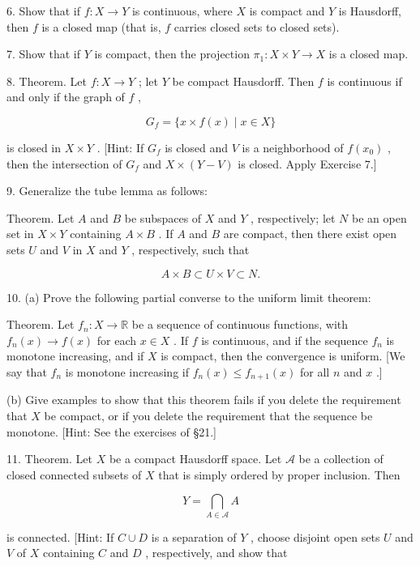 \documentclass[10pt]{article}
\begin{document}
6. Show that if \(f : X \rightarrow  Y\) is continuous, where \(X\) is compact and \(Y\) is Hausdorff, then \(f\) is a closed map (that is, \(f\) carries closed sets to closed sets).

7. Show that if \(Y\) is compact, then the projection \({\pi }_{1} : X \times  Y \rightarrow  X\) is a closed map.

8. Theorem. Let \(f : X \rightarrow  Y\) ; let \(Y\) be compact Hausdorff. Then \(f\) is continuous if and only if the graph of \(f\) ,

\[
{G}_{f} = \{ x \times  f\left( x\right)  \mid  x \in  X\}
\]

is closed in \(X \times  Y\) . [Hint: If \({G}_{f}\) is closed and \(V\) is a neighborhood of \(f\left( {x}_{0}\right)\) , then the intersection of \({G}_{f}\) and \(X \times  \left( {Y - V}\right)\) is closed. Apply Exercise 7.]

9. Generalize the tube lemma as follows:

Theorem. Let \(A\) and \(B\) be subspaces of \(X\) and \(Y\) , respectively; let \(N\) be an open set in \(X \times  Y\) containing \(A \times  B\) . If \(A\) and \(B\) are compact, then there exist open sets \(U\) and \(V\) in \(X\) and \(Y\) , respectively, such that

\[
A \times  B \subset  U \times  V \subset  N.
\]

10. (a) Prove the following partial converse to the uniform limit theorem:

Theorem. Let \({f}_{n} : X \rightarrow  \mathbb{R}\) be a sequence of continuous functions, with \({f}_{n}\left( x\right)  \rightarrow  f\left( x\right)\) for each \(x \in  X\) . If \(f\) is continuous, and if the sequence \({f}_{n}\) is monotone increasing, and if \(X\) is compact, then the convergence is uniform. [We say that \({f}_{n}\) is monotone increasing if \({f}_{n}\left( x\right)  \leq  {f}_{n + 1}\left( x\right)\) for all \(n\) and \(x\) .]

(b) Give examples to show that this theorem fails if you delete the requirement that \(X\) be compact, or if you delete the requirement that the sequence be monotone. [Hint: See the exercises of §21.]

11. Theorem. Let \(X\) be a compact Hausdorff space. Let \(\mathcal{A}\) be a collection of closed connected subsets of \(X\) that is simply ordered by proper inclusion. Then

\[
Y = \mathop{\bigcap }\limits_{{A \in  \mathcal{A}}}A
\]

is connected. [Hint: If \(C \cup  D\) is a separation of \(Y\) , choose disjoint open sets \(U\) and \(V\) of \(X\) containing \(C\) and \(D\) , respectively, and show that
\end{document}
